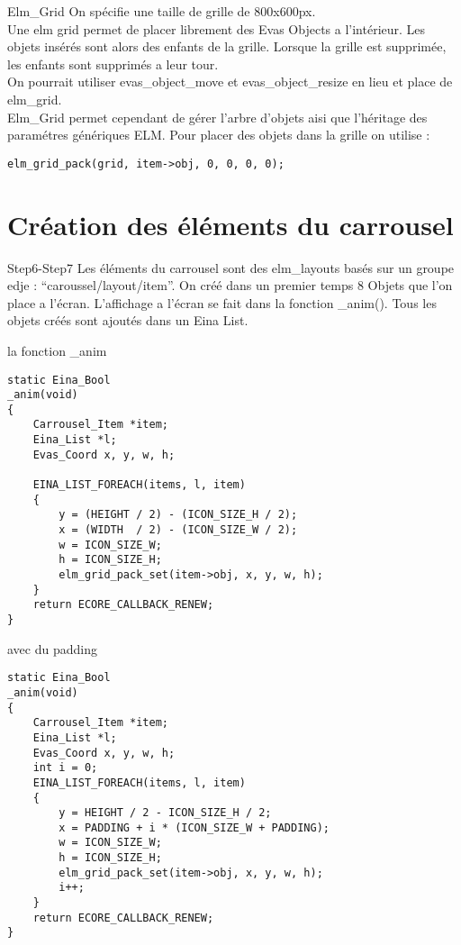 \documentclass{beamer}
\begin{document}
\begin{frame}[fragile]{Elm\_Grid}
On spécifie une taille de grille de 800x600px. \\
Une elm grid permet de placer librement des Evas Objects a l'intérieur. Les objets insérés sont alors des enfants de la grille. Lorsque la grille est supprimée, les enfants sont supprimés a leur tour.\\
On pourrait utiliser evas\_object\_move et evas\_object\_resize en lieu et place de elm\_grid.\\
Elm\_Grid permet cependant de gérer l'arbre d'objets aisi que l'héritage des paramétres génériques ELM.
Pour placer des objets dans la grille on utilise :
\begin{lstlisting}
elm_grid_pack(grid, item->obj, 0, 0, 0, 0);
\end{lstlisting}
\end{frame}

\section{Création des éléments du carrousel}

\begin{frame}[fragile]{Step6-Step7}
Les éléments du carrousel sont des elm\_layouts basés sur un groupe edje : ``caroussel/layout/item''.
On créé dans un premier temps 8 Objets que l'on place a l'écran. L'affichage a l'écran se fait dans la fonction \_anim(). Tous les objets créés sont ajoutés dans un Eina List.
\end{frame}
\begin{frame}[fragile]{la fonction \_anim}
\begin{lstlisting}
static Eina_Bool
_anim(void)
{
    Carrousel_Item *item;
    Eina_List *l;
    Evas_Coord x, y, w, h;

    EINA_LIST_FOREACH(items, l, item)
    {
        y = (HEIGHT / 2) - (ICON_SIZE_H / 2);
        x = (WIDTH  / 2) - (ICON_SIZE_W / 2);
        w = ICON_SIZE_W;
        h = ICON_SIZE_H;
        elm_grid_pack_set(item->obj, x, y, w, h);
    }
    return ECORE_CALLBACK_RENEW;
}
\end{lstlisting}
\end{frame}

\begin{frame}[fragile]{avec du padding}
\begin{lstlisting}
static Eina_Bool
_anim(void)
{
    Carrousel_Item *item;
    Eina_List *l;
    Evas_Coord x, y, w, h;
    int i = 0;
    EINA_LIST_FOREACH(items, l, item)
    {
        y = HEIGHT / 2 - ICON_SIZE_H / 2;
        x = PADDING + i * (ICON_SIZE_W + PADDING);
        w = ICON_SIZE_W;
        h = ICON_SIZE_H;
        elm_grid_pack_set(item->obj, x, y, w, h);
        i++;
    }
    return ECORE_CALLBACK_RENEW;
}
\end{lstlisting}
\end{frame}
\end{document}
